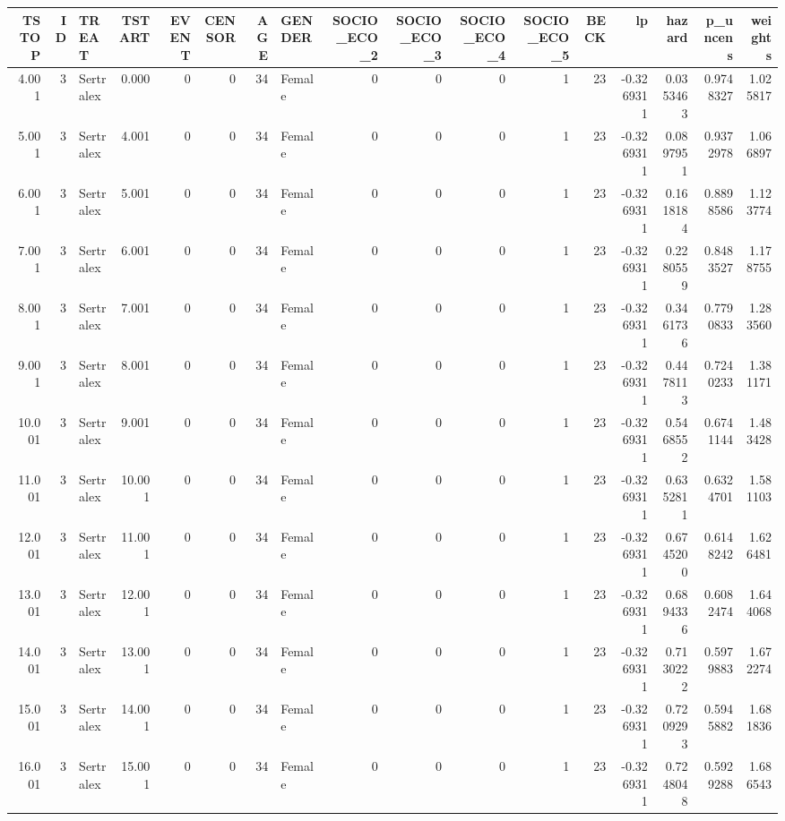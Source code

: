 \documentclass[
]{book}
\begin{document}
\begin{table}
\centering\begingroup\fontsize{12}{14}\selectfont

\begin{tabular}[t]{r|r|l|r|r|r|r|l|r|r|r|r|r|r|r|r|r}
\hline
TSTOP & ID & TREAT & TSTART & EVENT & CENSOR & AGE & GENDER & SOCIO\_ECO\_2 & SOCIO\_ECO\_3 & SOCIO\_ECO\_4 & SOCIO\_ECO\_5 & BECK & lp & hazard & p\_uncens & weights\\
\hline
4.001 & 3 & Sertralex & 0.000 & 0 & 0 & 34 & Female & 0 & 0 & 0 & 1 & 23 & -0.3269311 & 0.0353463 & 0.9748327 & 1.025817\\
\hline
5.001 & 3 & Sertralex & 4.001 & 0 & 0 & 34 & Female & 0 & 0 & 0 & 1 & 23 & -0.3269311 & 0.0897951 & 0.9372978 & 1.066897\\
\hline
6.001 & 3 & Sertralex & 5.001 & 0 & 0 & 34 & Female & 0 & 0 & 0 & 1 & 23 & -0.3269311 & 0.1618184 & 0.8898586 & 1.123774\\
\hline
7.001 & 3 & Sertralex & 6.001 & 0 & 0 & 34 & Female & 0 & 0 & 0 & 1 & 23 & -0.3269311 & 0.2280559 & 0.8483527 & 1.178755\\
\hline
8.001 & 3 & Sertralex & 7.001 & 0 & 0 & 34 & Female & 0 & 0 & 0 & 1 & 23 & -0.3269311 & 0.3461736 & 0.7790833 & 1.283560\\
\hline
9.001 & 3 & Sertralex & 8.001 & 0 & 0 & 34 & Female & 0 & 0 & 0 & 1 & 23 & -0.3269311 & 0.4478113 & 0.7240233 & 1.381171\\
\hline
10.001 & 3 & Sertralex & 9.001 & 0 & 0 & 34 & Female & 0 & 0 & 0 & 1 & 23 & -0.3269311 & 0.5468552 & 0.6741144 & 1.483428\\
\hline
11.001 & 3 & Sertralex & 10.001 & 0 & 0 & 34 & Female & 0 & 0 & 0 & 1 & 23 & -0.3269311 & 0.6352811 & 0.6324701 & 1.581103\\
\hline
12.001 & 3 & Sertralex & 11.001 & 0 & 0 & 34 & Female & 0 & 0 & 0 & 1 & 23 & -0.3269311 & 0.6745200 & 0.6148242 & 1.626481\\
\hline
13.001 & 3 & Sertralex & 12.001 & 0 & 0 & 34 & Female & 0 & 0 & 0 & 1 & 23 & -0.3269311 & 0.6894336 & 0.6082474 & 1.644068\\
\hline
14.001 & 3 & Sertralex & 13.001 & 0 & 0 & 34 & Female & 0 & 0 & 0 & 1 & 23 & -0.3269311 & 0.7130222 & 0.5979883 & 1.672274\\
\hline
15.001 & 3 & Sertralex & 14.001 & 0 & 0 & 34 & Female & 0 & 0 & 0 & 1 & 23 & -0.3269311 & 0.7209293 & 0.5945882 & 1.681836\\
\hline
16.001 & 3 & Sertralex & 15.001 & 0 & 0 & 34 & Female & 0 & 0 & 0 & 1 & 23 & -0.3269311 & 0.7248048 & 0.5929288 & 1.686543\\

\end{tabular}
\end{table}
\end{document}
